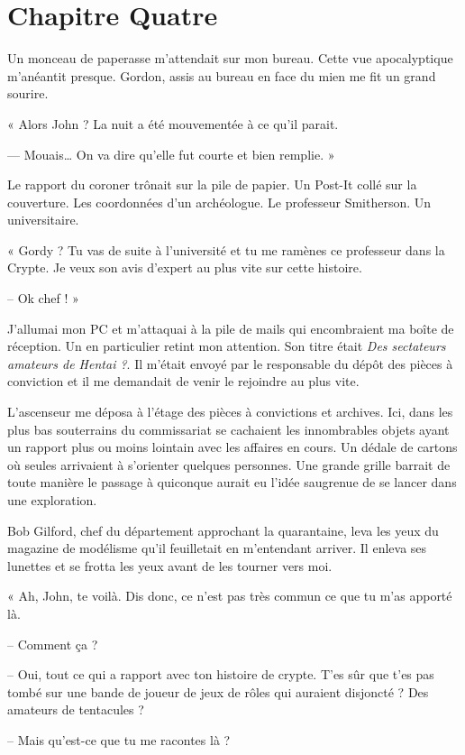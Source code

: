 \chapter[Chapitre Quatre]{Chapitre Quatre}
Un monceau de paperasse m'attendait sur mon bureau. Cette vue apocalyptique m'anéantit presque. Gordon, assis au bureau  
en face du mien me fit un grand sourire.

« Alors John ? La nuit a été mouvementée à ce qu'il parait.

— Mouais… On va dire qu'elle fut courte et bien remplie. »

Le rapport du coroner trônait sur la pile de papier. Un Post-It collé sur la couverture. Les coordonnées d'un
archéologue. Le professeur Smitherson. Un universitaire.

« Gordy ? Tu vas de suite à l'université et tu me ramènes ce professeur dans la Crypte. Je veux son avis d'expert au plus
vite sur cette histoire.

-- Ok chef ! »

J'allumai mon PC et m'attaquai à la pile de mails qui encombraient ma boîte de réception. Un en particulier retint mon
attention. Son titre était \emph{Des sectateurs amateurs de Hentai ?}. Il m'était envoyé par le responsable du dépôt des 
pièces à conviction et il me demandait de venir le rejoindre au plus vite.

L'ascenseur me déposa à l'étage des pièces à convictions et archives. Ici, dans les plus bas souterrains du commissariat se
cachaient les innombrables objets ayant un rapport plus ou moins lointain avec les affaires en cours. Un dédale de
cartons où seules arrivaient à s'orienter quelques personnes. Une grande grille barrait de toute manière le passage à
quiconque aurait eu l'idée saugrenue de se lancer dans une exploration.

Bob Gilford, chef du département approchant la quarantaine, leva les yeux du magazine de modélisme qu'il feuilletait en 
m'entendant arriver. Il enleva ses lunettes et se frotta les yeux avant de les tourner vers moi.

« Ah, John, te voilà. Dis donc, ce n'est pas très commun ce que tu m'as apporté là.

-- Comment ça ?

-- Oui, tout ce qui a rapport avec ton histoire de crypte. T'es sûr que t'es pas tombé sur une bande de joueur de jeux
de rôles qui auraient disjoncté ? Des amateurs de tentacules ?

-- Mais qu'est-ce que tu me racontes là ?


